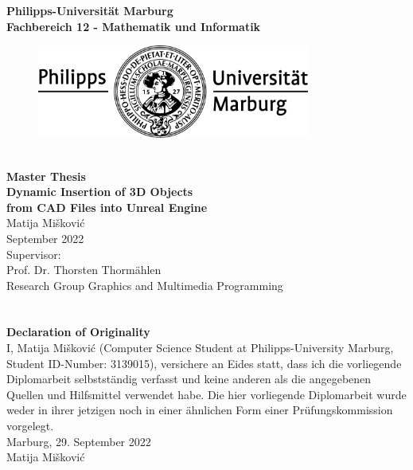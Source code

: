 \documentclass[a4paper, 11pt,bibtotoc,abstracton]{scrreprt}
\begin{document}
\begin{titlepage}
\begin{center}
{\huge \textbf{Philipps-Universität Marburg}}\\[0.5cm]
\textbf{Fachbereich 12 - Mathematik und Informatik}\\[0.5cm]

\begin{figure}[h]
	\centering
		\includegraphics[width=0.8\textwidth]{fig/unilogo.pdf}
\end{figure}

{\huge \textbf{{\large \\[1cm]Master Thesis}}}
\\[1cm]

{\Huge \textbf{Dynamic Insertion of 3D Objects\\ from CAD Files into Unreal Engine}}
\\[1cm]

{\large  Matija Mišković}\\
{\large September 2022}\\[3cm]

{\large
Supervisor:\\ Prof. Dr. Thorsten Thormählen\\[1cm]
Research Group Graphics and Multimedia Programming}

\end{center}
\end{titlepage}
\newpage
\thispagestyle{empty}
\section*{}
\newpage
\thispagestyle{empty}
\vspace*{7cm}
\textbf{\Large {Declaration of Originality}}\\[0.5cm]
I,  Matija Mišković (Computer Science Student at Philipps-University Marburg, Student ID-Number:
3139015), versichere an Eides statt, dass ich die vorliegende Diplomarbeit selbstständig verfasst und keine anderen
als die angegebenen Quellen und Hilfsmittel verwendet habe. Die hier vorliegende Diplomarbeit wurde weder in ihrer jetzigen noch in einer ähnlichen Form einer Prüfungskommission vorgelegt.\\[1cm]
Marburg, 29. September 2022\\[0.5cm]
 Matija Mišković
\newpage
\shipout\null


  
\end{document}
